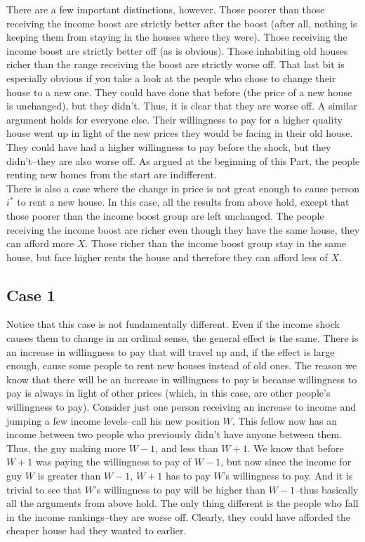 \documentclass[12pt]{paper}
\begin{document}
There are a few important distinctions, however. Those poorer than those receiving the income boost are strictly better after the boost (after all, nothing is keeping them from staying in the houses where they were). Those receiving the income boost are strictly better off (as is obvious). Those inhabiting old houses richer than the range receiving the boost are strictly worse off. That last bit is especially obvious if you take a look at the people who chose to change their house to a new one. They could have done that before (the price of a new house is unchanged), but they didn't. Thus, it is clear that they are worse off. A similar argument holds for everyone else. Their willingness to pay for a higher quality house went up in light of the new prices they would be facing in their old house. They could have had a higher willingness to pay before the shock, but they didn't--they are also worse off. As argued at the beginning of this Part, the people renting new homes from the start are indifferent.\\


There is also a case where the change in price is not great enough to cause person $i^*$ to rent a new house. In this case, all the results from above hold, except that those poorer than the income boost group are left unchanged. The people receiving the income boost are richer even though they have the same house, they can afford more $X$. Those richer than the income boost group stay in the same house, but face higher rents the house and therefore they can afford less of $X$.


\subsection*{Case 1}


Notice that this case is not fundamentally different. Even if the income shock causes them to change in an ordinal sense, the general effect is the same. There is an increase in willingness to pay that will travel up and, if the effect is large enough, cause some people to rent new houses instead of old ones. The reason we know that there will be an increase in willingness to pay is because willingness to pay is always in light of other prices (which, in this case, are other people's willingness to pay). Consider just one person receiving an increase to income and jumping a few income levels--call his new position $W$. This fellow now has an income between two people who previously didn't have anyone between them. Thus, the guy making more $W-1$, and less than $W+1$. We know that before $W+1$ was paying the willingness to pay of $W-1$, but now since the income for guy $W$ is greater than $W-1$, $W+1$ has to pay $W$'s willingness to pay. And it is trivial to see that $W$'s willingness to pay will be higher than $W-1$--thus basically all the arguments from above hold. The only thing different is the people who fall in the income rankings--they are worse off. Clearly, they could have afforded the cheaper house had they wanted to earlier.\\
\end{document}
